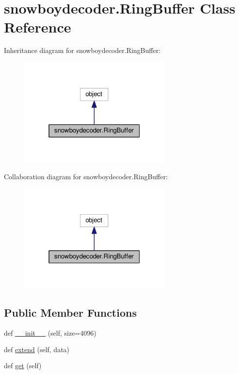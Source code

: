 \hypertarget{classsnowboydecoder_1_1RingBuffer}{}\section{snowboydecoder.\+Ring\+Buffer Class Reference}
\label{classsnowboydecoder_1_1RingBuffer}


Inheritance diagram for snowboydecoder.\+Ring\+Buffer\+:\nopagebreak
\begin{figure}[H]
\begin{center}
\leavevmode
\includegraphics[width=220pt]{classsnowboydecoder_1_1RingBuffer__inherit__graph}
\end{center}
\end{figure}


Collaboration diagram for snowboydecoder.\+Ring\+Buffer\+:\nopagebreak
\begin{figure}[H]
\begin{center}
\leavevmode
\includegraphics[width=220pt]{classsnowboydecoder_1_1RingBuffer__coll__graph}
\end{center}
\end{figure}
\subsection*{Public Member Functions}
\begin{DoxyCompactItemize}
\item 
def \hyperlink{classsnowboydecoder_1_1RingBuffer_a0e81257f8756886d0fbfb195ccd5b681}{\+\_\+\+\_\+init\+\_\+\+\_\+} (self, size=4096)
\item 
def \hyperlink{classsnowboydecoder_1_1RingBuffer_a8abd8bc5da6f36309861332258669790}{extend} (self, data)
\item 
def \hyperlink{classsnowboydecoder_1_1RingBuffer_ad083eb25f13fa3d7947caf62ca0d7353}{get} (self)
\end{DoxyCompactItemize}


